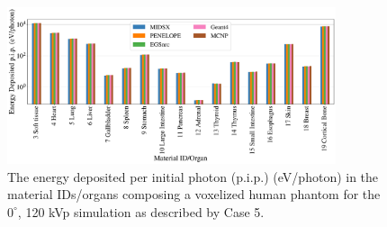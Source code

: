 \begin{figure}[p]
    \centering
	\includegraphics[width=0.86\textwidth]{../figures/CT_120_0_big_font.pdf}
	\caption{The energy deposited per initial photon (p.i.p.) (eV/photon) in the material IDs/organs composing a voxelized human phantom for the $0^\circ$, 120 kVp simulation as described by Case 5.}
	\label{fig:CTGraph}
\end{figure}

\FloatBarrier
